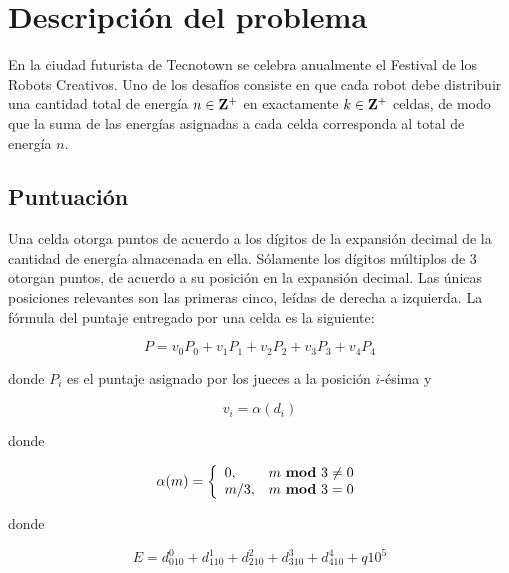 


\maketitle

\section{Descripción del problema}	
En la ciudad futurista de Tecnotown se celebra anualmente el Festival de los
Robots Creativos. Uno de los desafíos consiste en que cada robot debe distribuir
una cantidad total de energía $n \in \mathbf{Z}^+$ en exactamente $k \in \mathbf{Z}^+$ celdas, de
modo que la suma de las energías asignadas a cada celda corresponda al total de
energía $n$.

\subsection{Puntuación}
Una celda otorga puntos de acuerdo a los dígitos de la expansión decimal de la
cantidad de energía almacenada en ella. Sólamente los dígitos múltiplos de 3 otorgan
puntos, de acuerdo a su posición en la expansión decimal. Las únicas posiciones
relevantes son las primeras cinco, leídas de derecha a izquierda. La fórmula del
puntaje entregado por una celda es la siguiente:

\begin{equation}\label{cellscore}
	P= v_0P_0 + v_1 P_1 + v_2 P_2 + v_3 P_3 + v_4 P_4
\end{equation}

donde $P_i$ es el puntaje asignado por los jueces a la posición $i$-ésima y

\begin{equation}\label{vi}
	v_i= \alpha(d_i)
\end{equation}

donde

\begin{equation}\label{alpha}
	\alpha(m)=
	\left\{
		\begin{array}{ll}
			0, & \mbox{$m$ \textbf{mod} $3 \not= 0$}\\
			m/3, & \mbox{$m$ \textbf{mod} $3 = 0$}
		\end{array}
	\right.
\end{equation}

donde

\begin{equation}\label{edivalg}
	E = d_010^0 + d_110^1 + d_210^2 + d_310^3 + d_410^4 + q10^5
\end{equation}

